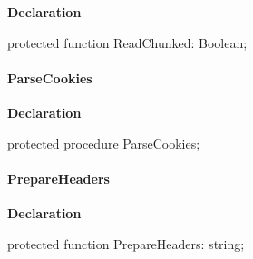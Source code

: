 \documentclass{report}
\newif\ifpdf
\begin{document}
\label{httpsend.THTTPSend-ReadChunked}
\begin{list}{}{
\setlength{\itemindent}{0cm}
\setlength{\listparindent}{0cm}
\setlength{\leftmargin}{\evensidemargin}
\addtolength{\leftmargin}{\tmplength}
\settowidth{\labelsep}{X}
\addtolength{\leftmargin}{\labelsep}
\setlength{\labelwidth}{\tmplength}
}
\item[\textbf{Declaration}\hfill]
\ifpdf
\begin{flushleft}
\fi
\begin{ttfamily}
protected function ReadChunked: Boolean;\end{ttfamily}

\ifpdf
\end{flushleft}
\fi

\end{list}
\paragraph*{ParseCookies}\hspace*{\fill}

\label{httpsend.THTTPSend-ParseCookies}
\begin{list}{}{
\setlength{\itemindent}{0cm}
\setlength{\listparindent}{0cm}
\setlength{\leftmargin}{\evensidemargin}
\addtolength{\leftmargin}{\tmplength}
\settowidth{\labelsep}{X}
\addtolength{\leftmargin}{\labelsep}
\setlength{\labelwidth}{\tmplength}
}
\item[\textbf{Declaration}\hfill]
\ifpdf
\begin{flushleft}
\fi
\begin{ttfamily}
protected procedure ParseCookies;\end{ttfamily}

\ifpdf
\end{flushleft}
\fi

\end{list}
\paragraph*{PrepareHeaders}\hspace*{\fill}

\label{httpsend.THTTPSend-PrepareHeaders}
\begin{list}{}{
\setlength{\itemindent}{0cm}
\setlength{\listparindent}{0cm}
\setlength{\leftmargin}{\evensidemargin}
\addtolength{\leftmargin}{\tmplength}
\settowidth{\labelsep}{X}
\addtolength{\leftmargin}{\labelsep}
\setlength{\labelwidth}{\tmplength}
}
\item[\textbf{Declaration}\hfill]
\ifpdf
\begin{flushleft}
\fi
\begin{ttfamily}
protected function PrepareHeaders: string;\end{ttfamily}

\ifpdf
\end{flushleft}
\fi

\end{list}
\end{document}
